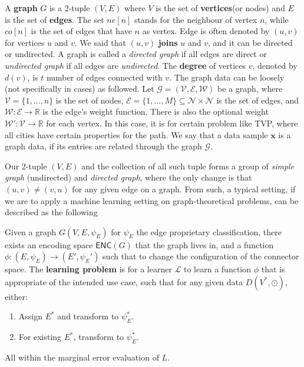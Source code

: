 A \textbf{graph} $G$ is a 2-tuple $(V,E)$ where $V$ is the set of \textbf{vertices}(or nodes) and $E$ is the set of \textbf{edges}. The set $ne[n]$ stands for the neighbour of vertex $n$, while $co[n]$ is the set of edges that have $n$ as vertex. Edge is often denoted by $(u,v)$ for vertices $u$ and $v$. We said that $(u,v)$ \textbf{joins} $u$ and $v$, and it can be directed or undirected. A graph is called a \textit{directed graph} if all edges are direct or \textit{undirected graph} if all edges are \textit{undirected}. The \textbf{degree} of vertices $v$, denoted by $d(v)$, is $t$ number of edges connected with $v$.
The graph data can be loosely (not specifically in cases) as followed. Let $\mathcal{G}=(\mathcal{V},\mathcal{E},\mathcal{W})$ be a graph, where $\mathcal{V}=\{1,\dots,n\}$ is the set of nodes, $\mathcal{E}=\{1,\dots,M\}\subseteq \mathcal{N}\times \mathcal{N}$ is the set of edges, and $\mathcal{W}: \mathcal{E}\to \mathbb{R}$ is the edge's weight function. There is also the optional weight $\mathcal{W}': \mathcal{V}\to \mathbb{R}$ for each vertex. In this case, it is for certain problem like TVP, where all cities have certain properties for the path. We say that a data sample $\mathbf{x}$ is a graph data, if its entries are related through the graph $\mathcal{G}$. 

Our 2-tuple $(V,E)$ and the collection of all such tuple forms a group of \textit{simple graph} (undirected) and \textit{directed graph}, where the only change is that $(u,v)\neq (v,u)$ for any given edge on a graph. From such, a typical setting, if we are to apply a machine learning setting on graph-theoretical problems, can be described as the following

\begin{definition}
    Given a graph $G(V,E,\psi_{E})$ for $\psi_{E}$ the edge proprietary classification, there exists an encoding space $\mathsf{ENC}(G)$ that the graph lives in, and a function $\phi: (E,\psi_{E})\to (E',\psi_{E}')$ such that to change the configuration of the connector space. The \textbf{learning problem} is for a learner $\mathcal{L}$ to learn a function $\phi$ that is appropriate of the intended use case, such that for any given data $D(V^{*},\odot)$, either:
    \begin{enumerate}
        \item Assign $E^{*}$ and transform to $\psi_{E}^{*}$. 
        \item For existing $E^{*}$, transform to $\psi^{*}_{E}$. 
    \end{enumerate}
    All within the marginal error evaluation of $L$. 
\end{definition}

